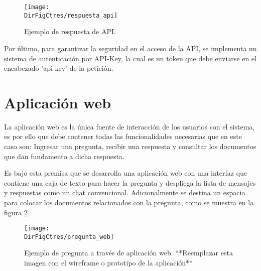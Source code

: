 \begin{figure}[]
    \centering
    \texttt{[image: \\DirFigCtres/respuesta\_api]}
    \caption{Ejemplo de respuesta de API.}
    \label{fig:respuesta_api}
\end{figure}

Por último, para garantizar la seguridad en el acceso de la API, se implementa
un sistema de autenticación por API-Key, la cual es un token que debe
enviarse en el encabezado 'api-key' de la petición.

\section{Aplicación web}

La aplicación web es la única fuente de interacción de los usuarios con el
sistema, es por ello que debe contener todas las funcionalidades necesarias
que en este caso son: Ingresar una pregunta, recibir una respuesta y
consultar los documentos que dan fundamento a dicha respuesta.

Es bajo esta premisa que se desarrolla una aplicación web con una interfaz
que contiene una caja de texto para hacer la pregunta y despliega la
lista de mensajes y respuestas como un chat convencional. Adicionalmente
se destina un espacio para colocar los documentos relacionados con la
pregunta, como se muestra en la figura \ref{fig:pregunta_web}.

\begin{figure}[]
    \centering
    \texttt{[image: \\DirFigCtres/pregunta\_web]}
    \caption{Ejemplo de pregunta a través de aplicación web. **Reemplazar
        esta imagen con el wireframe o prototipo de la aplicación**}
    \label{fig:pregunta_web}
\end{figure}
